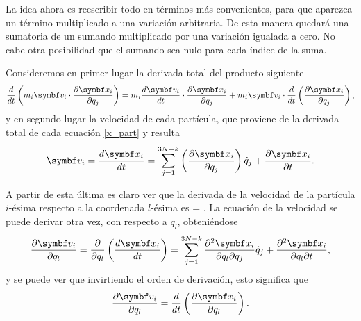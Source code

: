 \documentclass[10pt,oneside]{CBFT_book}
\begin{document}
La idea ahora es reescribir todo en términos más convenientes, para que aparezca un término multiplicado
a una variación arbitraria. De esta manera quedará una sumatoria de un sumando multiplicado por una
variación igualada a cero. No cabe otra posibilidad que el sumando sea nulo para cada índice de la suma.

Consideremos en primer lugar la derivada total del producto siguiente
\[
	\frac{d}{dt}\left( m_i\vb{v}_i \cdot \dpar{\vb{x}_i}{q_j} \right) =
	m_i \dtot{\vb{v}_i}{t} \cdot \dpar{\vb{x}_i}{q_j} + m_i \vb{v}_i 
	\cdot \frac{d}{dt}\left(\dpar{\vb{x}_i}{q_j}\right),
\]
y en segundo lugar la velocidad de cada partícula, que proviene de la derivada total de cada ecuación 
\eqref{x_part} y resulta
\[
	\vb{v}_i = \dtot{\vb{x}_i}{t} = \sum_{j=1}^{3N-k} \left( \dpar{\vb{x}_i}{q_j} \right)
	\dot{q}_j + \dpar{\vb{x}_i}{t}.
\]

A partir de esta última es claro ver que la derivada de la velocidad de la partícula $i$-ésima respecto a la coordenada 
$l$-ésima es
\be
	 = .
	\label{relacion_derivadas}
\ee
{}
La ecuación de la velocidad se puede derivar otra vez, con respecto a $q_l$, obteniéndose
\[
	\dpar{\vb{v}_i}{q_l} = \frac{\partial}{\partial q_l} \left( \dtot{\vb{x}_i}{t} \right) =
	\sum_{j=1}^{3N-k} \dparcru{\vb{x}_i}{q_j}{q_l} \dot{q}_j + 
	\dparcru{\vb{x}_i}{t}{q_l},
\]
y se puede ver que invirtiendo el orden de derivación, esto significa que 
\[
	\dpar{\vb{v}_i}{q_l} = \frac{d}{dt} \left( \dpar{\vb{x}_i}{q_l} \right).
\]

% 
\end{document}
